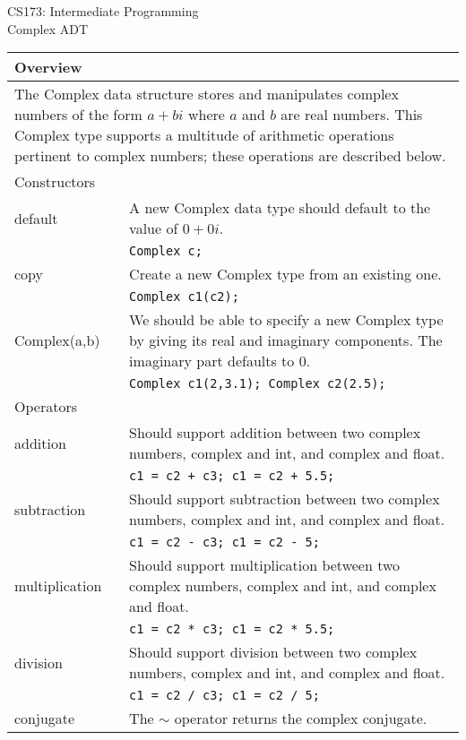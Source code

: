 \documentclass[11pt]{article}
\begin{document}
\begin{center}
CS173: Intermediate Programming \\
\Large{Complex ADT}
\end{center}

\begin{tabular}{|p{1in}|p{4in}|}
\hline
\multicolumn{2}{|l|}{Overview} \\ \hline
\multicolumn{2}{|p{5in}|}{
The Complex data structure stores and manipulates complex numbers of the form $a+bi$ where $a$ and $b$ are real numbers.  This Complex type supports a multitude of arithmetic operations pertinent to complex numbers; these operations are described below.
}  \\
\hline
\hline
\multicolumn{2}{|l|}{Constructors} \\ \hline
default & A new Complex data type should default to the value of $0+0i$.  \\
 & \texttt{Complex c; } \\
\hline
copy & Create a new Complex type from an existing one. \\
& \texttt{Complex c1(c2); } \\
\hline
Complex(a,b) & We should be able to specify a new Complex type by giving its real and imaginary components.   The imaginary part defaults to 0.  \\
& \texttt{Complex c1(2,3.1);  Complex c2(2.5);} \\
\hline
\hline
\multicolumn{2}{|l|}{Operators} \\ \hline
addition & Should support addition between two complex numbers, complex and int, and complex and float.  \\
& \texttt{c1 = c2 + c3;  c1 = c2 + 5.5; } \\
\hline
subtraction & Should support subtraction between two complex numbers, complex and int, and complex and float.  \\
& \texttt{c1 = c2 - c3;  c1 = c2 - 5; } \\
\hline
multiplication & Should support multiplication between two complex numbers, complex and int, and complex and float.  \\
& \texttt{c1 = c2 * c3;  c1 = c2 * 5.5; } \\
\hline
division & Should support division between two complex numbers, complex and int, and complex and float.  \\
& \texttt{c1 = c2 / c3;  c1 = c2 / 5; } \\
\hline
conjugate & The $\sim$ operator returns the complex conjugate.  \\

\end{tabular}
\end{document}
